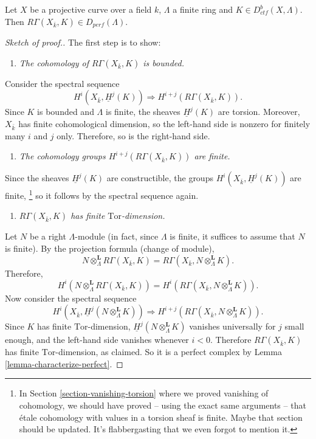\begin{proposition}
\label{proposition-projective-curve-constructible-cohomology}
Let $X$ be a projective curve over a field $k$, $\Lambda$ a finite ring and
$K\in D_{ctf}^b (X, \Lambda)$. Then $R\Gamma(X_{\bar k}, K)\in
D_{perf}(\Lambda)$.
\end{proposition}

\begin{proof}[Sketch of proof.]
The first step is to show:
\begin{enumerate}
\item[(1)]
{\it The cohomology of $R\Gamma(X_{\bar k}, K)$ is bounded.}
\end{enumerate}
Consider the spectral sequence
$$
H^i(X_{\bar k}, \underline H^j(K))
\Rightarrow
H^{i+j} (R\Gamma(X_{\bar k}, K)).
$$
Since $K$ is bounded and $\Lambda$ is finite, the sheaves $\underline H^j(K)$
are torsion. Moreover, $X_{\bar k}$ has finite cohomological dimension, so the
left-hand side is nonzero for finitely many $i$ and $j$ only. Therefore, so is
the right-hand side.
\begin{enumerate}
\item[(2)]
{\it The cohomology groups $H^{i+j} (R\Gamma(X_{\bar k}, K))$ are finite.}
\end{enumerate}
Since the sheaves $\underline H^j(K)$ are constructible, the groups
$H^i(X_{\bar k}, \underline H^j(K))$ are finite, \footnote{In
Section \ref{section-vanishing-torsion}
where we proved vanishing of
cohomology, we should have proved -- using the exact same arguments -- that
\'etale cohomology with values in a torsion sheaf is finite. Maybe that section
should be updated. It's flabbergasting that we even forgot to mention it.} so
it follows by the spectral sequence again.
\begin{enumerate}
\item[(3)]
{\it $R\Gamma(X_{\bar k}, K)$ has finite $\text{Tor}$-dimension.}
\end{enumerate}
Let $N$ be a right $\Lambda$-module (in fact, since $\Lambda$ is finite, it
suffices to assume that $N$ is finite). By the projection formula (change of
module),
$$
N \otimes^\mathbf{L}_\Lambda R \Gamma(X_{\bar k}, K) = R\Gamma(X_{\bar k},
N \otimes^\mathbf{L}_\Lambda K).
$$
Therefore,
$$
H^i (N \otimes^\mathbf{L}_\Lambda R\Gamma(X_{\bar k}, K)) = H^i(R\Gamma(X_{\bar
k}, N \otimes_{\Lambda}^\mathbf{L} K)).
$$
Now consider the spectral sequence
$$
H^i (X_{\bar k}, \underline H^j (N \otimes_{\Lambda}^\mathbf{L} K))
\Rightarrow
H^{i+j}(R\Gamma(X_{\bar k}, N \otimes_{\Lambda}^\mathbf{L} K)).
$$
Since $K$ has finite $\text{Tor}$-dimension, $\underline H^j
(N \otimes_{\Lambda}^\mathbf{L} K)$ vanishes universally for $j$ small enough,
and the left-hand side vanishes whenever $i < 0$. Therefore $R\Gamma(X_{\bar
k}, K)$ has finite $\text{Tor}$-dimension, as claimed. So it is a perfect
complex by Lemma \ref{lemma-characterize-perfect}.
\end{proof}





